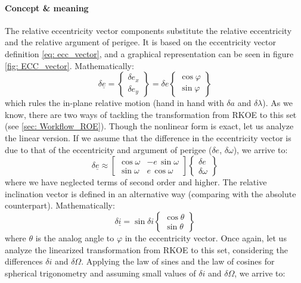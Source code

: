 	\paragraph{Concept \& meaning\\}
	\indent The relative eccentricity vector components substitute the relative eccentricity and the relative argument of perigee. It is based on the eccentricity vector definition \eqref{eq: 	ecc_vector}, and a graphical representation can be seen in figure \ref{fig: 	ECC_vector}. Mathematically:
	\[
	\delta \underline{e} = 
	\left\{ 
	\begin{array}{c}
	\delta e_x \\[1.5em]
	\delta e_y
	\end{array}
	\right\} = \delta e
	\left\{ 
	\begin{array}{c}
	\cos\varphi \\[1.5em]
	\sin\varphi
	\end{array}
	\right\}
	\]
	\noindent which rules the in-plane relative motion (hand in hand with $\delta a$ and $\delta \lambda$). As we know, there are two ways of tackling the transformation from RKOE to this set (see \ref{sec: Workflow_ROE}). Though the nonlinear form is exact, let us analyze the linear version. If we assume that the difference in the eccentricity vector is due to that of the eccentricity and argument of perigee ($\delta e$, $\delta \omega$), we arrive to:
	\begin{equation}
	\delta \underline{e} \approx 
	\left[ 
	\begin{array}{cc}
	\cos\omega  & -e\, \sin\omega\\[1.5em]
	\sin\omega  & e\, \cos\omega
	\end{array}
	\right]
	\left\{ 
	\begin{array}{c}
	\delta e \\[1.5em]
	\delta \omega
	\end{array}
	\right\}
	\label{eq: 	e_vec_mat}
	\end{equation}
	\noindent where we have neglected terms of second order and higher. The relative inclination vector is defined in an alternative way \cite{DAmico_montenbruck} (comparing with the absolute counterpart). Mathematically:
	\[
	\delta \underline{i} = \sin \delta i
	\left\{ 
	\begin{array}{c}
	\cos\theta \\[1.5em]
	\sin\theta
	\end{array}
	\right\}
	\]
	\noindent where $\theta$ is the analog angle to $\varphi$ in the eccentricity vector. Once again, let us analyze the linearized transformation from RKOE to this set, considering the differences $\delta i$ and $\delta \Omega$. Applying the law of sines and the law of cosines for spherical trigonometry and assuming small values of $\delta i$ and $\delta \Omega$, we arrive to:
